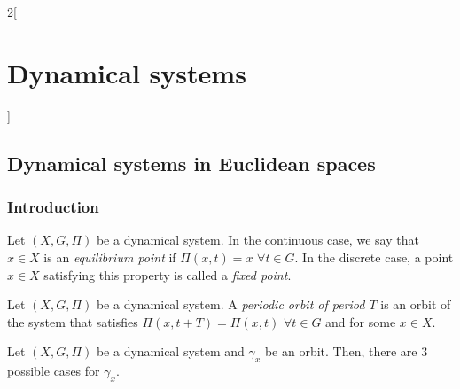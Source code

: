 \documentclass[../../../main_math.tex]{subfiles}
\begin{document}
\begin{multicols}{2}[\section{Dynamical systems}]
  \subsection{Dynamical systems in Euclidean spaces}
  \subsubsection{Introduction}
  \begin{definition}
    Let $(X,G,\Pi)$ be a dynamical system. In the continuous case, we say that $x\in X$ is an \emph{equilibrium point} if $\Pi(x,t)=x$ $\forall t\in G$. In the discrete case, a point $x\in X$ satisfying this property is called a \emph{fixed point}.
  \end{definition}
  \begin{definition}
    Let $(X,G,\Pi)$ be a dynamical system. A \emph{periodic orbit of period $T$} is an orbit of the system that satisfies $\Pi(x,t+T)=\Pi(x,t)$ $\forall t\in G$ and for some $x\in X$.
  \end{definition}
  \begin{theorem}
    Let $(X,G,\Pi)$ be a dynamical system and $\gamma_x$ be an orbit. Then, there are 3 possible cases for $\gamma_x$.


\end{theorem}
\end{multicols}
\end{document}
